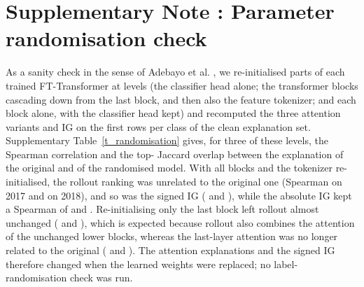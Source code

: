\section*{Supplementary Note \suppNoteRand: Parameter randomisation check}
\label{sec:si_rand}
As a sanity check in the sense of Adebayo et al. \cite{adebayo2018}, we re-initialised parts of each trained
FT-Transformer at \nRandLevels{} levels (the classifier head alone; the transformer blocks cascading down from the last
block, and then also the feature tokenizer; and each block alone, with the classifier head kept) and recomputed the
three attention variants and IG on the first \randRowsPerClass{} rows per class of the clean explanation set.
Supplementary Table~\ref{t_randomisation} gives, for three of these levels, the Spearman correlation and the
top-\paramTopK{} Jaccard overlap between the explanation of the original and of the randomised model.
With all blocks and the tokenizer re-initialised, the rollout ranking was unrelated to the original one (Spearman
\randRolloutAllSeventeen{} on 2017 and \randRolloutAllEighteen{} on 2018), and so was the signed IG
(\randIGSignedAllSeventeen{} and \randIGSignedAllEighteen), while the absolute IG kept a Spearman of
\randIGAbsAllSeventeen{} and \randIGAbsAllEighteen.
Re-initialising only the last block left rollout almost unchanged (\randRolloutTopOneSeventeen{} and
\randRolloutTopOneEighteen), which is expected because rollout also combines the attention of the unchanged lower
blocks, whereas the last-layer attention was no longer related to the original (\randLastTopOneSeventeen{} and
\randLastTopOneEighteen).
The attention explanations and the signed IG therefore changed when the learned weights were replaced; no
label-randomisation check was run.

